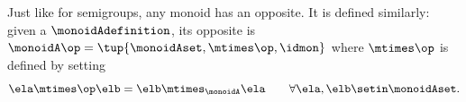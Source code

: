 \begin{remark}
    Just like for semigroups, any monoid has an opposite.
    It is defined similarly: given a  $\monoidAdefinition$, its opposite is $\monoidA \op = \tup{ \monoidAset, \mtimes\op, \idmon }$ where $\mtimes\op$ is defined by setting
    \begin{equation}
        \ela \mtimes \op \elb = \elb \mtimes_{\monoidA} \ela \qquad \forall \ela, \elb \setin \monoidAset.
    \end{equation}
\end{remark}







